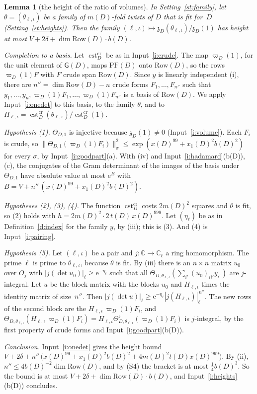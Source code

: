 \documentclass[11pt,a4paper]{article}
\makeatletter
\newcommand{\lean}[1]{\csname LN@#1\endcsname}
\newcommand{\leantag}{{\sffamily\bfseries\fontsize{6.3}{8}\selectfont\color{leancol}\addfontfeatures{LetterSpace=7}LEAN}}
\newcommand{\leanline}[1]{\par\nopagebreak\vspace{-2.5pt}{\fontsize{8.9}{12.4}\selectfont\color{inksoft}\raggedright
  \noindent\llap{\leantag\hspace{9pt}}#1\par}\vspace{1pt}}
\theoremstyle{plainx}
\newtheorem{lemma}[theorem]{Lemma}
\theoremstyle{uprightx}
\renewenvironment{proof}[1][Proof]{\par\pushQED{\qed}\normalfont\topsep0pt\partopsep0pt
  \trivlist\item[\hskip\labelsep\itshape #1.]\ignorespaces}{\popQED\endtrivlist\@endpefalse}
\newcommand{\C}{\mathbb{C}}
\newcommand{\ee}{\mathrm{e}}
\newcommand{\scx}[1]{x(#1)}
\newcommand{\scxo}[1]{x_1(#1)}
\newcommand{\scb}[1]{b(#1)}
\newcommand{\Dm}[1]{m(#1)}
\newcommand{\Row}[1]{\mathrm{Row}(#1)}
\newcommand{\GD}[1]{\mathsf{G}(#1)}
\newcommand{\PF}[1]{\mathrm{PF}(#1)}
\newcommand{\gpt}[2]{\varpi_{#1}(#2)}
\newcommand{\Th}[2]{\Theta_{#1,#2}}
\newcommand{\Thf}[2]{\Theta^{\flat}_{#1,#2}}
\newcommand{\nsq}[2]{\|#1\|^{2}_{#2}}
\newcommand{\zz}[2]{\mathfrak{z}_{#1}(#2)}
\newcommand{\cst}[2]{\operatorname{cst}^{\mathrm{#1}}_{#2}}
\makeatother
\begin{document}
\begin{lemma}[the height of the ratio of volumes]\label{l:volrows}
In Setting~\ref{st:family}, let $\theta=(\theta_{\ell,\iota})$ be a family of $\Dm{D}$-fold twists of $D$ that is fit
for~$D$ (Setting~\ref{st:heights}). Then the family $(\ell,\iota)\mapsto\zz{D}{\theta_{\ell,\iota}}/\zz{D}{1}$ has
height at most $V+2\delta+\dim\Row{D}\cdot \scb{D}$.
\end{lemma}
\begin{proof}
\emph{Completion to a basis.} Let $\cst{cr}{D}$ be as in Input~\ref{i:crude}. The map $\gpt{D}{1}$, for the unit
element of $\GD{D}$, maps $\PF{D}$ onto $\Row{D}$, so the rows $\gpt{D}{1}F$ with $F$ crude span $\Row{D}$. Since $y$
is linearly independent (i), there are $n''=\dim\Row{D}-n$ crude forms $F_1,\dots,F_{n''}$ such that
$y_1,\dots,y_n,\gpt{D}{1}F_1,\dots,\gpt{D}{1}F_{n''}$ is a basis of $\Row{D}$. We apply Input~\ref{i:onedet} to this
basis, to the family $\theta$, and to $H_{\ell,\iota}=\cst{cr}{D}(\theta_{\ell,\iota})/\cst{cr}{D}(1)$.

\emph{Hypothesis (1).} $\Th{D}{1}$ is injective because $\zz{D}{1}\ne0$ (Input~\ref{i:volume}). Each $F_i$ is crude,
so $\nsq{\Th{D}{1}(\gpt{D}{1}F_i)}{\sigma}\le\exp(\scx{D}^{99}+\scxo{D}^{2}\scb{D}^{2})$ for every $\sigma$, by
Input~\ref{i:goodpart}(a). With (iv) and Input~\ref{i:hadamard}(\scb{D}), (c), the conjugates of the Gram determinant of
the images of the basis under $\Th{D}{1}$ have absolute value at most $\ee^{B}$ with
$B=V+n''\,(\scx{D}^{99}+\scxo{D}^{2}\scb{D}^{2})$.

\emph{Hypotheses (2), (3), (4).} The function $\cst{cr}{D}$ costs $2\Dm{D}^{2}$ squares and $\theta$ is fit, so (2) holds
with $h=2\Dm{D}^{2}\cdot2\,t(D)\,\scx{D}^{999}$. Let $(\eta_\ell)$ be as in Definition~\ref{d:index} for the family $y$, by
(iii); this is (3). And (4) is Input~\ref{i:pairing}.

\emph{Hypothesis (5).} Let $(\ell,\iota)$ be a pair and $j\colon\C\to\C_\ell$ a ring homomorphism. The prime $\ell$ is
prime to $\theta_{\ell,\iota}$, because $\theta$ is fit. By (iii) there is an $n\times n$ matrix $u_0$ over $O_j$ with
$|j(\det u_0)|_\ell\ge\ee^{-\eta_\ell}$ such that all
$\Th{D}{\theta_{\ell,\iota}}(\sum_{i'}(u_0)_{ii'}y_{i'})$ are $j$-integral. Let $u$ be the block matrix with the blocks
$u_0$ and $H_{\ell,\iota}$ times the identity matrix of size~$n''$. Then
$|j(\det u)|_\ell\ge\ee^{-\eta_\ell}|j(H_{\ell,\iota})|_\ell^{\,n''}$. The new rows of the second block are the
$H_{\ell,\iota}\,\gpt{D}{1}F_i$, and $\Th{D}{\theta_{\ell,\iota}}(H_{\ell,\iota}\,\gpt{D}{1}F_i)
=H_{\ell,\iota}\Thf{D}{\theta_{\ell,\iota}}(\gpt{D}{1}F_i)$ is $j$-integral, by the first property of crude forms and
Input~\ref{i:goodpart}(\scb{D}).

\emph{Conclusion.} Input~\ref{i:onedet} gives the height bound
$V+2\delta+n''\,\bigl(\scx{D}^{99}+\scxo{D}^{2}\scb{D}^{2}+4\Dm{D}^{2}t(D)\scx{D}^{999}\bigr)$. By (ii), $n''\le4\scb{D}^{-2}\dim\Row{D}$, and by (S4)
the bracket is at most $\tfrac14\scb{D}^{3}$. So the bound is at most $V+2\delta+\dim\Row{D}\cdot \scb{D}$, and
Input~\ref{i:heights}(\scb{D}) concludes.
\end{proof}
\leanline{\lean{heightLevolumerows}}
\end{document}
